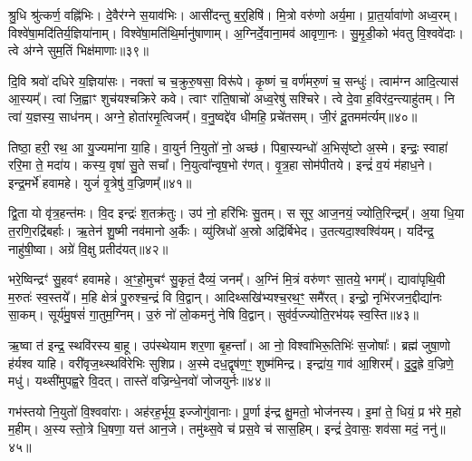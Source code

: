 श्रु॒धि श्रु॑त्कर्ण॒ वह्नि॑भिः।
दे॒वैर॑ग्ने स॒याव॑भिः।
आसी॑दन्तु ब॒र्॒हिषि॑।
मि॒त्रो वरु॑णो अर्य॒मा।
प्रा॒त॒र्यावा॑णो अध्व॒रम्।
विश्वे॑षा॒मदि॑तिर्य॒ज्ञिया॑नाम्।
विश्वे॑षा॒मति॑थि॒र्मानु॑षाणाम्।
अ॒ग्निर्दे॒वाना॒\-मव॑ आवृणा॒नः।
सु॒मृ॒डी॒को भ॑वतु वि॒श्ववे॑दाः।
त्वे अ॑ग्ने सुम॒तिं भिक्ष॑माणाः॥३९॥

दि॒वि श्रवो॑ दधिरे य॒ज्ञिया॑सः।
नक्ता॑ च च॒क्रुरु॒षसा॒ विरू॑पे।
कृ॒ष्णं च॒ वर्ण॑मरु॒णं च॒ सन्धुः॑।
त्वाम॑ग्न आदि॒त्यास॑ आ॒स्यम्᳚।
त्वां जि॒ह्वाꣳ शुच॑यश्चक्रिरे कवे।
त्वाꣳ रा॑ति॒षाचो॑ अध्व॒रेषु॑ सश्चिरे।
त्वे दे॒वा ह॒विर॑द॒न्त्याहु॑तम्।
नि त्वा॑ य॒ज्ञस्य॒ साध॑नम्।
अग्ने॒ होता॑रमृ॒त्विजम्᳚।
व॒नु॒ष्वद्दे॑व धीमहि॒ प्रचे॑तसम्।
जी॒रं दू॒तमम॑र्त्यम्॥४०॥\anuvakamend[य॒ज्ञ॒वा॒ह॒सा॒स॒प॒र्य॒न्व॒यमृ॑द्ध्यां॒ भिक्ष॑माणाः॒ प्रचे॑तस॒मेकं॑ च]

तिष्ठा॒ हरी॒ रथ॒ आ यु॒ज्यमा॑ना या॒हि।
वा॒युर्न नि॒युतो॑ नो॒ अच्छ॑।
पिबा॒स्यन्धो॑ अ॒भिसृ॑ष्टो अ॒स्मे।
इन्द्रः॒ स्वाहा॑ ररि॒मा ते॒ मदा॑य।
कस्य॒ वृषा॑ सु॒ते सचा᳚।
नि॒युत्वा᳚न्वृष॒भो र॑णत्।
वृ॒त्र॒हा सोम॑पीतये।
इन्द्रं॑ व॒यं म॑हाध॒ने।
इन्द्र॒मर्भे॑ हवामहे।
युजं॑ वृ॒त्रेषु॑ व॒ज्रिणम्᳚॥४१॥

द्वि॒ता यो वृ॑त्र॒हन्त॑मः।
वि॒द इन्द्रः॑ श॒तक्र॑तुः।
उप॑ नो॒ हरि॑भिः सु॒तम्।
स सूर॒ आज॒नयं॒ ज्योति॒रिन्द्रम्᳚।
अ॒या धि॒या त॒रणि॒रद्रि॑बर्\mbox{}हाः।
ऋ॒तेन॑ शु॒ष्मी नव॑मानो अ॒र्कैः।
व्यु॑स्रिधो॑ अ॒स्रो अद्रि॑र्बिभेद।
उ॒तत्यदा॒श्वश्वि॑यम्।
यदि॑न्द्र॒ नाहु॑षी॒ष्वा।
अग्रे॑ वि॒क्षु प्रतीद॑यत्॥४२॥

भरे॒ष्विन्द्रꣳ॑ सु॒हवꣳ॑ हवामहे।
अ॒ꣳ॒हो॒मुचꣳ॑ सु॒कृतं॒ दैव्यं॒ जनम्᳚।
अ॒ग्निं मि॒त्रं वरु॑णꣳ सा॒तये॒ भगम्᳚।
द्यावा॑पृथि॒वी म॒रुतः॑ स्व॒स्तये᳚।
म॒हि क्षेत्रं॑ पु॒रुश्च॒न्द्रं वि वि॒द्वान्।
आदिथ्सखि॑भ्यश्च॒रथ॒ꣳ॒ समै॑रत्।
इन्द्रो॒ नृभि॑रजन॒द्दीद्या॑नः सा॒कम्।
सूर्य॑मु॒षसं॑ गा॒तुम॒ग्निम्।
उ॒रुं नो॑ लो॒कमनु॑ नेषि वि॒द्वान्।
सुव॑र्व॒ज्ज्योति॒रभ॑यꣴ स्व॒स्ति॥४३॥

ऋ॒ष्वा त॑ इन्द्र॒ स्थवि॑रस्य बा॒हू।
उप॑स्थेयाम शर॒णा बृ॒हन्ता᳚।
आ नो॒ विश्वा॑भिरू॒तिभिः॑ स॒जोषाः᳚।
ब्रह्म॑ जुषा॒णो ह॑र्यश्व याहि।
वरी॑वृज॒थ्स्थवि॑रेभिः सुशिप्र।
अ॒स्मे दध॒द्वृष॑ण॒ꣳ॒ शुष्म॑मिन्द्र।
इन्द्रा॑य॒ गाव॑ आ॒शिरम्᳚।
दु॒दु॒ह्रे व॒ज्रिणे॒ मधु॑।
यथ्सी॑मुपह्व॒रे वि॒दत्।
तास्ते॑ वज्रिन्धे॒नवो॑ जोजयुर्नः॥४४॥

गभ॑स्तयो नि॒युतो॑ वि॒श्ववा॑राः।
अह॑रह॒र्भूय॒ इज्जोगु॑वानाः।
पू॒र्णा इ॑न्द्र क्षु॒मतो॒ भोज॑नस्य।
इ॒मां ते॒ धियं॒ प्र भ॑रे म॒हो म॒हीम्।
अ॒स्य स्तो॒त्रे धि॒षणा॒ यत्त॑ आन॒जे।
तमु॑थ्स॒वे च॑ प्रस॒वे च॑ सास॒हिम्।
इन्द्रं॑ दे॒वासः॒ शव॑सा मदं॒ ननु॑॥४५॥\anuvakamend[व॒ज्रिण॑मयथ्स्व॒स्ति जो॑जयुर्नः स॒प्त च॑]

